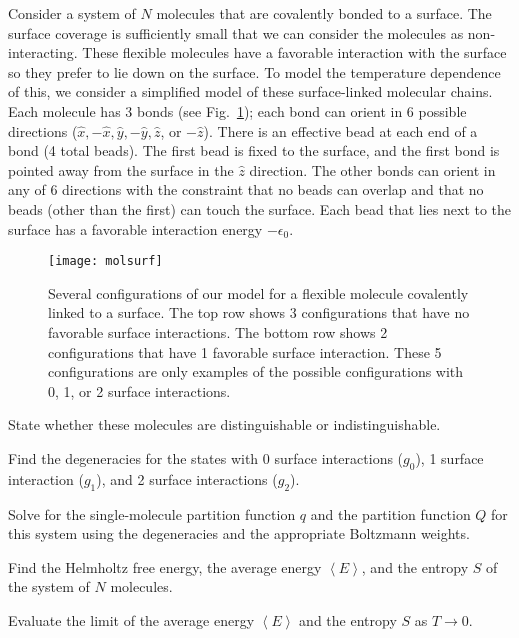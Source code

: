 Consider a system of $N$ molecules that are covalently bonded to a surface.
The surface coverage is sufficiently small that we can consider the molecules
as non-interacting.
These flexible molecules have a favorable interaction with the surface so
they prefer to lie down on the surface.  To model the temperature dependence
of this, we consider a simplified model of these surface-linked molecular chains.
Each molecule has 3 bonds (see Fig.~\ref{fig:model}); each bond can
orient in 6 possible directions ($\hat{x}, -\hat{x}, \hat{y}, -\hat{y}, \hat{z}$, or $-\hat{z}$).
There is an effective bead at each end of a bond (4 total beads).  The first bead is
fixed to the surface, and the first bond is pointed away from the surface in the 
$\hat{z}$ direction.  The other bonds can orient in any of 6 directions with the constraint
that no beads can overlap and that no beads (other than the first) can touch the
surface.  Each bead that lies next to the surface has a favorable interaction energy
$-\epsilon_{0}$.

\begin{figure}[h]\centering
\texttt{[image: molsurf]}\par
\bigskip
\caption{
Several configurations of our model for a flexible molecule covalently linked to a surface.
The top row shows 3 configurations that have no favorable surface interactions.
The bottom row shows 2 configurations that have 1 favorable surface interaction.
These 5 configurations are only examples of the possible configurations
with 0, 1, or 2 surface interactions.
\label{fig:model}}
\end{figure}

\smallskip\subp
State whether these molecules are distinguishable or indistinguishable.

\smallskip\subp
Find the degeneracies for the states with 
0 surface interactions ($g_{0}$),
1 surface interaction ($g_{1}$),
and 2 surface interactions ($g_{2}$).

\smallskip\subp
Solve for the single-molecule partition function $q$ 
and the partition function $Q$ for this system using
the degeneracies and the appropriate Boltzmann weights.

\smallskip\subp
Find the Helmholtz free energy, the average energy $\left< E \right>$,
and the entropy $S$ of the system of $N$ molecules.

\smallskip\subp
Evaluate the limit of the average energy $\left< E \right>$
and the entropy $S$ as $T \rightarrow 0$.

